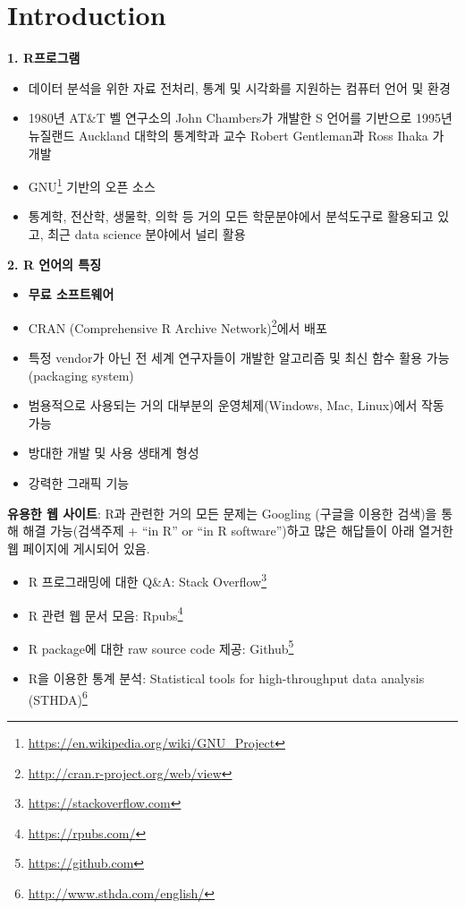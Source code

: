 \documentclass[
  11pt,
]{krantz}
\providecommand{\tightlist}{%
  \setlength{\itemsep}{0pt}\setlength{\parskip}{0pt}}
\renewcommand{\href}[2]{#2\footnote{\url{#1}}}
\let\BeginKnitrBlock\begin \let\EndKnitrBlock\end
\begin{document}
\hypertarget{intro-chap}{%
\chapter{Introduction}\label{intro-chap}}

\textbf{1. R프로그램}

\begin{itemize}
\tightlist
\item
  데이터 분석을 위한 자료 전처리, 통계 및 시각화를 지원하는 컴퓨터 언어 및 환경
\item
  1980년 AT\&T 벨 연구소의 John Chambers가 개발한 S 언어를 기반으로 1995년 뉴질랜드 Auckland 대학의 통계학과 교수 Robert Gentleman과 Ross Ihaka 가 개발
\item
  \href{https://en.wikipedia.org/wiki/GNU_Project}{GNU} 기반의 오픈 소스
\item
  통계학, 전산학, 생물학, 의학 등 거의 모든 학문분야에서 분석도구로 활용되고 있고, 최근 data science 분야에서 널리 활용
\end{itemize}

\textbf{2. R 언어의 특징}

\begin{itemize}
\tightlist
\item
  \textbf{무료 소프트웨어}
\item
  \href{http://cran.r-project.org/web/view}{CRAN (Comprehensive R Archive Network)}에서 배포
\item
  특정 vendor가 아닌 전 세계 연구자들이 개발한 알고리즘 및 최신 함수 활용 가능(packaging system)
\item
  범용적으로 사용되는 거의 대부분의 운영체제(Windows, Mac, Linux)에서 작동 가능
\item
  방대한 개발 및 사용 생태계 형성
\item
  강력한 그래픽 기능
\end{itemize}

\footnotesize

\BeginKnitrBlock{rmdtip}
\textbf{유용한 웹 사이트}: R과 관련한 거의 모든 문제는 Googling (구글을 이용한 검색)을 통해 해결 가능(검색주제 + ``in R'' or ``in R software'')하고 많은 해답들이 아래 열거한 웹 페이지에 게시되어 있음.

\begin{itemize}
\tightlist
\item
  R 프로그래밍에 대한 Q\&A: \href{https://stackoverflow.com}{Stack Overflow}
\item
  R 관련 웹 문서 모음: \href{https://rpubs.com/}{Rpubs}
\item
  R package에 대한 raw source code 제공: \href{https://github.com}{Github}
\item
  R을 이용한 통계 분석: \href{http://www.sthda.com/english/}{Statistical tools for high-throughput data analysis (STHDA)}
\end{itemize}
\EndKnitrBlock{rmdtip}
\end{document}
